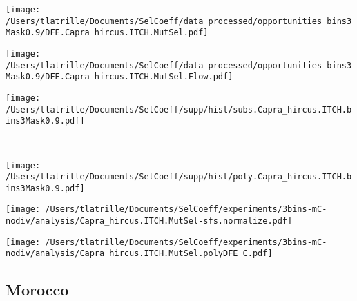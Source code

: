 \documentclass{article}
\begin{document}
    \begin{minipage}{0.32\linewidth}
        \texttt{[image: /Users/tlatrille/Documents/SelCoeff/data\_processed/opportunities\_bins3Mask0.9/DFE.Capra\_hircus.ITCH.MutSel.pdf]}
    \end{minipage}
    \begin{minipage}{0.32\linewidth}
        \texttt{[image: /Users/tlatrille/Documents/SelCoeff/data\_processed/opportunities\_bins3Mask0.9/DFE.Capra\_hircus.ITCH.MutSel.Flow.pdf]}
    \end{minipage}
    \begin{minipage}{0.32\linewidth}
        \texttt{[image: /Users/tlatrille/Documents/SelCoeff/supp/hist/subs.Capra\_hircus.ITCH.bins3Mask0.9.pdf]}
    \end{minipage}
    \\
    \begin{minipage}{0.32\linewidth}
        \texttt{[image: /Users/tlatrille/Documents/SelCoeff/supp/hist/poly.Capra\_hircus.ITCH.bins3Mask0.9.pdf]}
    \end{minipage}
    \begin{minipage}{0.32\linewidth}
        \texttt{[image: /Users/tlatrille/Documents/SelCoeff/experiments/3bins-mC-nodiv/analysis/Capra\_hircus.ITCH.MutSel-sfs.normalize.pdf]}
    \end{minipage}
    \begin{minipage}{0.32\linewidth}
        \texttt{[image: /Users/tlatrille/Documents/SelCoeff/experiments/3bins-mC-nodiv/analysis/Capra\_hircus.ITCH.MutSel.polyDFE\_C.pdf]}
    \end{minipage}
    \subsection{Morocco}
\end{document}
